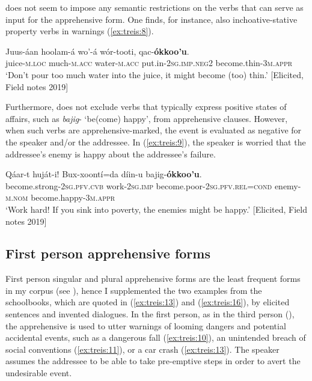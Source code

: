 \documentclass[output=paper,colorlinks,citecolor=brown,]{langscibook}
\begin{document}
 does not seem to impose any semantic restrictions on the verbs that can serve as input for the apprehensive form. One finds, for instance, also inchoative-stative property verbs in warnings (\ref{ex:treis:8}).

\ea\label{ex:treis:8}
\gll Juus-áan		hoolam-á 		wo'-á 			wór-tooti, 				qac-\textbf{ókkoo'u}. \\
juice-\textsc{m.loc}	much-\textsc{m.acc}	water-\textsc{m.acc}	put.in-\textsc{2sg.imp.neg2}	become.thin-\textsc{3m.appr}\\
\glt `Don't pour too much water into the juice, it might become (too) thin.'  [Elicited, Field notes 2019]
\z 

Furthermore,  does not exclude verbs that typically express positive states of affairs, such as \textit{bajig}- `be(come) happy', from apprehensive clauses. However, when such verbs are apprehensive-marked, the event is evaluated as negative for the speaker and/or the addressee. In (\ref{ex:treis:9}), the speaker is worried that the addressee's enemy is happy about the addressee's failure.

\ea\label{ex:treis:9}
\gll Qáar-t						huját-i! 			Bux-xoontí=da						díin-u bajig-\textbf{ókkoo'u}. \\
become.strong-\textsc{2sg.pfv.cvb}	work-\textsc{2sg.imp}	become.poor-\textsc{2sg.pfv.rel=cond} enemy-\textsc{m.nom} become.happy-\textsc{3m.appr}\\
\glt `Work hard! If you sink into poverty, the enemies might be happy.'  [Elicited, Field notes 2019]
\z 

\subsection{First person apprehensive forms}\label{sec:treis:3.2}

First person singular and plural apprehensive forms are the least frequent forms in my corpus (see ), hence I supplemented the two examples from the schoolbooks, which are quoted in (\ref{ex:treis:13}) and (\ref{ex:treis:16}), by elicited sentences and invented dialogues. In the first person, as in the third person (), the apprehensive is used to utter warnings of looming dangers and potential accidental events, such as a dangerous fall (\ref{ex:treis:10}), an unintended breach of social conventions (\ref{ex:treis:11}), or a car crash (\ref{ex:treis:13}). The speaker assumes the addressee to be able to take pre-emptive steps in order to avert the undesirable event.
\end{document}
